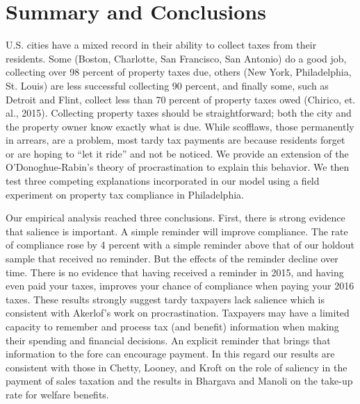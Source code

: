 \documentclass[12pt]{article}
\newcommand{\TAG}[1]{}
\begin{document}
\TAG{END_BODY}

\section{Summary and Conclusions}

\TAG{BEGIN_CONCLUSION}

U.S. cities have a mixed record in their ability to collect taxes from
their residents.  Some (Boston, Charlotte, San Francisco, San Antonio)
do a good job, collecting over 98 percent of property taxes due,
others (New York, Philadelphia, St.  Louis) are less successful
collecting 90 percent, and finally some, such as Detroit and Flint,
collect less than 70 percent of property taxes owed (Chirico, et.
al., 2015).  Collecting property taxes should be
straightforward; both the city and the property owner know exactly
what is due.  While scofflaws, those permanently in arrears, are a
problem, most tardy tax payments are because residents forget or
are hoping to ``let it ride'' and not be noticed.  We provide an
extension of the O'Donoghue-Rabin's \citeyear{DR-99} theory of
procrastination to explain this behavior. We then test three competing explanations
incorporated in our model using a field experiment on property tax
compliance in Philadelphia.

Our empirical analysis reached three conclusions.  First, there is
strong evidence that salience is important.  A simple reminder will improve compliance.  The
rate of compliance rose by 4 percent with a simple reminder above that
of our holdout sample that received no reminder.  But the effects of
the reminder decline over time.  There is no evidence that having
received a reminder in 2015, and having even paid your taxes, improves
your chance of compliance when paying your 2016 taxes.  These results 
strongly suggest tardy taxpayers lack salience which is consistent with Akerlof's \citeyear{Akerlof-91} work
on procrastination.  Taxpayers may have a limited capacity to remember
and process tax (and benefit) information when making their spending
and financial decisions.  An explicit reminder that brings that
information to the fore can encourage payment.  In this regard our
results are consistent with those in Chetty, Looney, and Kroft
\citeyear{chetty2009salience} on the role of saliency in the payment
of sales taxation and the results in Bhargava and Manoli
\citeyear{Bhargava-15} on the take-up rate for welfare benefits.
\end{document}

